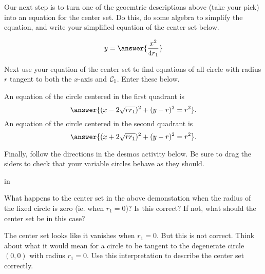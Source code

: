 \documentclass{ximera}
\newcommand{\pskip}{\vskip 0.1 in}
\begin{document}
\begin{exploration}

Our next step is to turn one of the geoemtric descriptions above (take your pick) into an equation for the center set. Do this, do some algebra to simplify the equation, and write your simplified equation of the center set below.
\begin{question} \label{Q341:Spheres}
\[
    y = \answer{\frac{x^2}{4r_1}}
\]
\end{question}


Next use your equation of the center set to find equations of all circle with radius $r$  tangent to both the $x$-axis and ${\cal C}_1$. Enter these below.

\begin{question} \label{Q4541:Spheres}
An equation of the circle centered in the first quadrant is
\[
     \answer{(x-2\sqrt{rr_1})^2 + (y-r)^2 = r^2} .
\]
An equation of the circle centered in the second quadrant is
\[
     \answer{(x+2\sqrt{rr_1})^2 + (y-r)^2 = r^2} .
\]
\end{question}

Finally, follow the directions in the desmos activity below. Be sure to drag the siders to check that your variable circles behave as they should.


 
\begin{onlineOnly}
    \begin{center}
\end{center}
\end{onlineOnly}

\pskip

\begin{question} \label{Q441:Spheres}
What happens to the center set in the above demonstation when the radius of the fixed circle is zero (ie. when $r_1=0$)? Is this correct? If not, what should the center set be in this case?
\begin{hint}
The center set looks like it vanishes when $r_1=0$. But this is not correct. Think about what it would mean for a circle to be tangent to the degenerate circle $(0,0)$ with radius $r_1=0$. Use this interpretation to describe the center set correctly.
\end{hint}

\end{question}
\end{exploration}
\end{document}
